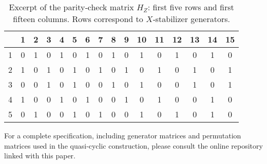 \documentclass[conference]{IEEEtran}  %
\begin{document}
\begin{table}[h]
\centering
\caption{Excerpt of the parity‑check matrix $H_Z$: first five rows and first fifteen columns.  Rows correspond to $X$‑stabilizer generators.}
\label{tab:Hz-sample}
\begin{tabular}{cccccccccccccccc}
\hline
 & 1 & 2 & 3 & 4 & 5 & 6 & 7 & 8 & 9 & 10 & 11 & 12 & 13 & 14 & 15 \\
\hline
1 & 0 & 1 & 0 & 1 & 0 & 1 & 0 & 1 & 0 & 1 & 0 & 1 & 0 & 1 & 0 \\
2 & 1 & 0 & 1 & 0 & 1 & 0 & 1 & 0 & 1 & 0 & 1 & 0 & 1 & 0 & 1 \\
3 & 0 & 0 & 1 & 0 & 1 & 0 & 0 & 1 & 0 & 1 & 0 & 0 & 1 & 0 & 1 \\
4 & 1 & 0 & 0 & 1 & 0 & 1 & 0 & 0 & 1 & 0 & 1 & 0 & 0 & 1 & 0 \\
5 & 0 & 1 & 0 & 0 & 1 & 0 & 1 & 0 & 0 & 1 & 0 & 1 & 0 & 1 & 0 \\
\hline
\end{tabular}
\end{table}

For a complete specification, including generator matrices and permutation matrices used in the quasi‑cyclic construction, please consult the online repository linked with this paper.
\end{document}
